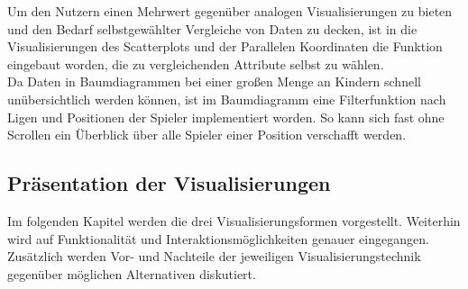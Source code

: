 \documentclass[usegeometry=true]{scrartcl}
\begin{document}
Um den Nutzern einen Mehrwert gegenüber analogen Visualisierungen zu bieten und den Bedarf selbstgewählter Vergleiche von Daten zu decken, ist in die Visualisierungen des Scatterplots und der Parallelen Koordinaten die Funktion eingebaut worden, die zu vergleichenden Attribute selbst zu wählen.\\
Da Daten in Baumdiagrammen bei einer großen Menge an Kindern schnell unübersichtlich werden können, ist im Baumdiagramm eine Filterfunktion nach Ligen und Positionen der Spieler implementiert worden. So kann sich fast ohne Scrollen ein Überblick über alle Spieler einer Position verschafft werden.


\subsection{Präsentation der Visualisierungen}

Im folgenden Kapitel werden die drei Visualisierungsformen vorgestellt. Weiterhin wird auf Funktionalität und Interaktionsmöglichkeiten genauer eingegangen. Zusätzlich werden Vor- und Nachteile der jeweiligen Visualisierungstechnik gegenüber möglichen Alternativen diskutiert.


\end{document}
